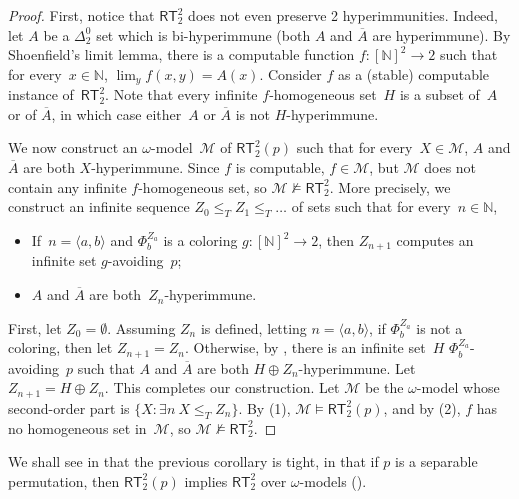 \documentclass{article}
\numberwithin{theorem}{section}
\newtheorem{corollary}[theorem]{Corollary}
\def\M{\mathcal{M}}
\newcommand{\RT}[0]{\mathsf{RT}}
\newcommand{\NN}[0]{\mathbb{N}}
\begin{document}
\begin{proof}
First, notice that $\RT^2_2$ does not even preserve 2 hyperimmunities.
Indeed, let $A$ be a $\Delta^0_2$ set which is bi-hyperimmune (both $A$ and $\overline{A}$ are hyperimmune). By Shoenfield's limit lemma, there is a computable function $f : [\NN]^2 \to 2$ such that for every~$x \in \NN$, $\lim_y f(x, y) = A(x)$. Consider $f$ as a (stable) computable instance of~$\RT^2_2$. Note that every infinite $f$-homogeneous set~$H$ is a subset of~$A$ or of $\overline{A}$, in which case either~$A$ or $\overline{A}$ is not $H$-hyperimmune.

We now construct an $\omega$-model~$\M$ of $\RT^2_2(p)$ such that for every~$X \in \M$, $A$ and $\overline{A}$ are both $X$-hyperimmune. Since $f$ is computable, $f \in \M$, but $\M$ does not contain any infinite $f$-homogeneous set, so $\M \not \models \RT^2_2$.
More precisely, we construct an infinite sequence $Z_0 \leq_T Z_1 \leq_T \dots$ of sets such that for every~$n \in \NN$,
\begin{itemize}
    \item[(1)] If~$n = \langle a, b\rangle$ and $\Phi^{Z_a}_b$ is a coloring $g : [\NN]^2 \to 2$, then $Z_{n+1}$ computes an infinite set $g$-avoiding~$p$;
    \item[(2)] $A$ and $\overline{A}$ are both~$Z_n$-hyperimmune.
\end{itemize}
First, let $Z_0 = \emptyset$. Assuming $Z_n$ is defined, letting $n = \langle a, b \rangle$, if $\Phi^{Z_a}_b$ is not a coloring, then let $Z_{n+1} = Z_n$. Otherwise,  by , there is an infinite set~$H$ $\Phi^{Z_a}_b$-avoiding~$p$ such that $A$ and $\overline{A}$ are both $H \oplus Z_n$-hyperimmune. Let $Z_{n+1} = H \oplus Z_n$. This completes our construction.
Let $\M$ be the $\omega$-model whose second-order part is $\{ X : \exists n\ X \leq_T Z_n \}$. By (1), $\M \models \RT^2_2(p)$, and by (2), $f$ has no homogeneous set in~$\M$, so $\M \not \models \RT^2_2$.
\end{proof}

We shall see in  that the previous corollary is tight, in that if $p$ is a separable permutation, then $\RT^2_2(p)$ implies $\RT^2_2$ over $\omega$-models ().
\end{document}

